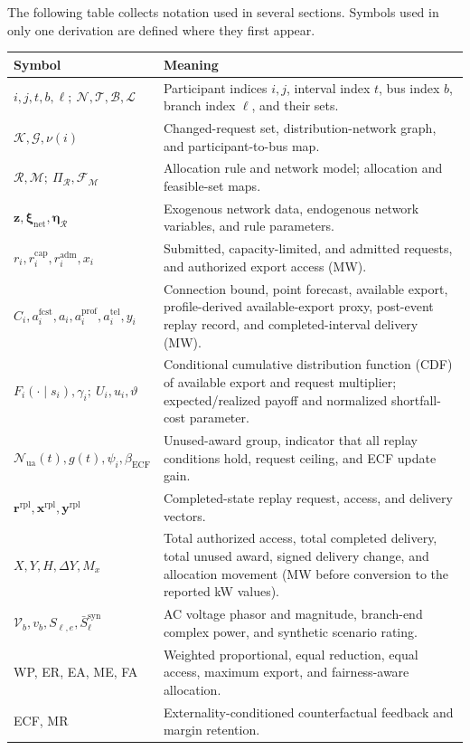 \documentclass[11pt]{article}
\begin{document}
The following table collects notation used in several sections. Symbols used in
only one derivation are defined where they first appear.
\begin{center}
\footnotesize
\renewcommand{\arraystretch}{1.05}
\begin{tabular}{@{}p{}p{}@{}}
\hline
Symbol & Meaning \\
\hline
$i,j,t,b,\ell;\ \mathcal N,\mathcal T,\mathcal B,\mathcal L$ & Participant indices $i,j$, interval index $t$, bus index $b$, branch index $\ell$, and their sets. \\
$\mathcal K,\mathcal G,\nu(i)$ & Changed-request set, distribution-network graph, and participant-to-bus map. \\
$\mathcal R,\mathcal M;\ \Pi_{\mathcal R},\mathcal F_{\mathcal M}$ & Allocation rule and network model; allocation and feasible-set maps. \\
$\mathbf z,\boldsymbol\xi_{\mathrm{net}},\boldsymbol\eta_{\mathcal R}$ & Exogenous network data, endogenous network variables, and rule parameters. \\
$r_i,r_i^{\mathrm{cap}},r_i^{\mathrm{adm}},x_i$ & Submitted, capacity-limited, and admitted requests, and authorized export access (MW). \\
$C_i,a_i^{\mathrm{fcst}},a_i,a_i^{\mathrm{prof}},a_i^{\mathrm{tel}},y_i$ & Connection bound, point forecast, available export, profile-derived available-export proxy, post-event replay record, and completed-interval delivery (MW). \\
$F_i(\cdot\mid s_i),\gamma_i;\ U_i,u_i,\vartheta$ & Conditional cumulative distribution function (CDF) of available export and request multiplier; expected/realized payoff and normalized shortfall-cost parameter. \\
$\mathcal N_{\mathrm{ua}}(t),g(t),\psi_i,\beta_{\mathrm{ECF}}$ & Unused-award group, indicator that all replay conditions hold, request ceiling, and ECF update gain. \\
$\mathbf r^{\mathrm{rpl}},\mathbf x^{\mathrm{rpl}},\mathbf y^{\mathrm{rpl}}$ & Completed-state replay request, access, and delivery vectors. \\
$X,Y,H,\Delta Y,M_x$ & Total authorized access, total completed delivery, total unused award, signed delivery change, and allocation movement (MW before conversion to the reported kW values). \\
$\mathcal V_b,v_b,S_{\ell,e},\bar S_{\ell}^{\mathrm{syn}}$ & AC voltage phasor and magnitude, branch-end complex power, and synthetic scenario rating. \\
WP, ER, EA, ME, FA & Weighted proportional, equal reduction, equal access, maximum export, and fairness-aware allocation. \\
ECF, MR & Externality-conditioned counterfactual feedback and margin retention. \\
\hline
\end{tabular}
\end{center}
\end{document}
